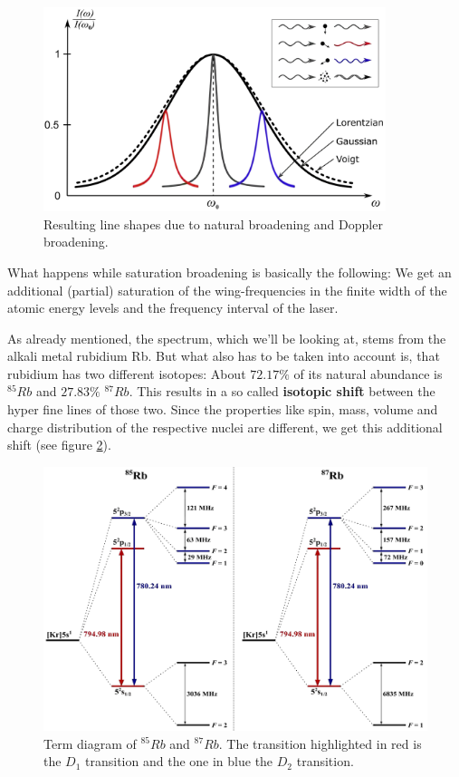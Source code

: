 \begin{figure}[h]
    \centering
    \includegraphics[width=10cm]{Dopp.png}
    \caption{Resulting line shapes due to natural broadening and Doppler broadening.}
    \label{fig:Dopp.}
\end{figure}

\noindent
What happens while saturation broadening is basically the following: We get an additional (partial) saturation of the wing-frequencies in the finite width of the atomic energy levels and the frequency interval of the laser.

As already mentioned, the spectrum, which we'll be looking at, stems from the alkali metal rubidium Rb. But what also has to be taken into account is, that rubidium has two different isotopes: About $72.17\%$ of its natural abundance is $^{85}Rb$ and $27.83\%$ $^{87}Rb$. This results in a so called \textbf{isotopic shift} between the hyper fine lines of those two. Since the properties like spin, mass, volume and charge distribution of the respective nuclei are different, we get this additional shift (see figure \ref{fig:term.}).

\begin{figure}[h]
    \centering
    \includegraphics[width=15.8cm]{term.png}
    \caption{Term diagram of $^{85}Rb$ and $^{87}Rb$. The transition highlighted in red is the $D_{1}$ transition and the one in blue the $D_{2}$ transition.}
    \label{fig:term.}
\end{figure}

